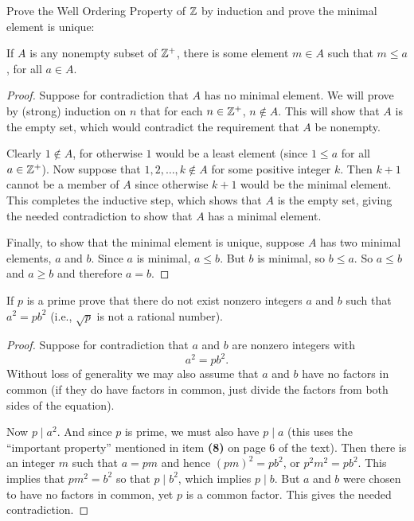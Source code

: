  Prove the Well Ordering Property of $\mathbb{Z}$ by induction and
prove the minimal element is unique:
\begin{thm}
  If $A$ is any nonempty subset of $\mathbb{Z}^+$, there is some element
  $m\in A$ such that $m\leq a$, for all $a\in A$.
\end{thm}
\begin{proof}
  Suppose for contradiction that $A$ has no minimal element. We will
  prove by (strong) induction on $n$ that for each $n\in\mathbb{Z}^+$,
  $n\not\in A$. This will show that $A$ is the empty set, which would
  contradict the requirement that $A$ be nonempty.

  Clearly $1\not\in A$, for otherwise $1$ would be a least element
  (since $1\leq a$ for all $a\in\mathbb{Z}^+$). Now suppose that
  $1, 2, \ldots, k\not\in A$ for some positive integer $k$. Then
  $k + 1$ cannot be a member of $A$ since otherwise $k + 1$ would be
  the minimal element. This completes the inductive step, which shows
  that $A$ is the empty set, giving the needed contradiction to show
  that $A$ has a minimal element.

  Finally, to show that the minimal element is unique, suppose $A$ has
  two minimal elements, $a$ and $b$. Since $a$ is minimal, $a\leq
  b$. But $b$ is minimal, so $b\leq a$. So $a\leq b$ and $a\geq b$ and
  therefore $a = b$.
\end{proof}

 If $p$ is a prime prove that there do not exist nonzero
integers $a$ and $b$ such that $a^2 = pb^2$ (i.e., $\sqrt p$ is not a
rational number).
\begin{proof}
  Suppose for contradiction that $a$ and $b$ are nonzero integers with
  \begin{equation*}
    a^2 = pb^2.
  \end{equation*}
  Without loss of generality we may also assume that $a$ and $b$ have
  no factors in common (if they do have factors in common, just divide
  the factors from both sides of the equation).

  Now $p \mid a^2$. And since $p$ is prime, we must also have
  $p\mid a$ (this uses the ``important property'' mentioned in item
  {\bf(8)} on page 6 of the text). Then there is an integer $m$ such
  that $a = pm$ and hence $(pm)^2 = pb^2$, or $p^2m^2 = pb^2$. This
  implies that $pm^2 = b^2$ so that $p \mid b^2$, which implies
  $p\mid b$. But $a$ and $b$ were chosen to have no factors in common,
  yet $p$ is a common factor. This gives the needed contradiction.
\end{proof}

